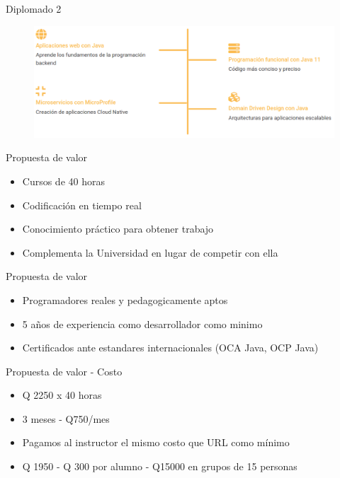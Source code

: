 \documentclass[aspectratio=169]{beamer}
\begin{document}
\begin{frame}[fragile]{Diplomado 2}
	\begin{figure}
		\centering
		\includegraphics[width=\linewidth]{Images/backend}
	\end{figure}
	
\end{frame}
\begin{frame}[fragile]{Propuesta de valor}
	\begin{itemize}
		\item Cursos de 40 horas
		\item Codificación en tiempo real
		\item Conocimiento práctico para obtener trabajo
		\item Complementa la Universidad en lugar de competir con ella
	\end{itemize}	
\end{frame}

\begin{frame}[fragile]{Propuesta de valor}
	\begin{itemize}
		\item Programadores reales y pedagogicamente aptos
		\item 5 años de experiencia como desarrollador como minimo
		\item Certificados ante estandares internacionales (OCA Java, OCP Java)
	\end{itemize}	
\end{frame}

\begin{frame}[fragile]{Propuesta de valor - Costo}
	\begin{itemize}
		\item Q 2250 x 40 horas
		\item 3 meses - Q750/mes
		\item Pagamos al instructor el mismo costo que URL como mínimo
		\item Q 1950 - Q 300 por alumno - Q15000 en grupos de 15 personas
	\end{itemize}	
\end{frame}
\end{document}
